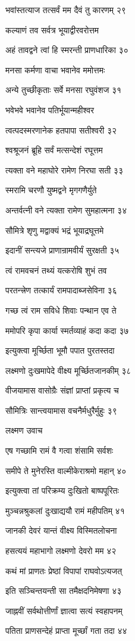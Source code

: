भवांस्तत्याज तत्सर्वं मम दैवं तु कारणम् २९

कल्याणं तव सर्वत्र भूयाद्वीरवरोत्तम

अहं तावद्वने त्वां हि स्मरन्ती प्राणधारिका ३०

मनसा कर्मणा वाचा भवानेव ममोत्तमः

अन्ये तुच्छीकृताः सर्वे मनसा रघुवंशज ३१

भवेभवे भवानेव पतिर्भूयान्महीश्वर

त्वत्पदस्मरणानेक हतपापा सतीश्वरी ३२

श्वश्रूजनं ब्रूहि सर्वं मत्सन्देशं रघूत्तम

त्यक्ता वने महाघोरे रामेण निरघा सती ३३

स्मरामि चरणौ युष्मद्वने मृगगणैर्युते

अन्तर्वत्नी वने त्यक्ता रामेण सुमहात्मना ३४

सौमित्रे शृणु मद्वाक्यं भद्रं भूयाद्रघूत्तमे

इदानीं सन्त्यजे प्राणान्रामवीर्यं सुरक्षती ३५

त्वं रामवचनं तथ्यं यत्करोषि शुभं तव

परतन्त्त्रेण तत्कार्यं रामपादाब्जसेविना ३६

गच्छ त्वं राम सविधे शिवाः पन्थान एव ते

ममोपरि कृपा कार्या स्मर्तव्याहं कदा कदा ३७

इत्युक्त्वा मूर्च्छिता भूमौ पपात पुरतस्तदा

लक्ष्मणो दुःखमापेदे वीक्ष्य मूर्च्छितजानकीम् ३८

वीजयामास वासोग्रैः संज्ञां प्राप्तां प्रकृत्य च

सौमित्रिः सान्त्वयामास वचनैर्मधुरैर्मुहुः ३९

लक्ष्मण उवाच

एष गच्छामि रामं वै गत्वा शंसामि सर्वशः

समीपे ते मुनेरस्ति वाल्मीकेराश्रमो महान् ४०

इत्युक्त्वा तां परिक्रम्य दुःखितो बाष्पपूरितः

मुञ्चन्नश्रुकलां दुःखाद्ययौ रामं महीपतिम् ४१

जानकी देवरं यान्तं वीक्ष्य विस्मितलोचना

हसत्ययं महाभागो लक्ष्मणो देवरो मम ४२

कथं मां प्राणतः प्रेष्ठां विपापां राघवोऽत्यजत्

इति सञ्चिन्तयन्ती सा तमैक्षदनिमेषणा ४३

जाह्नवीं सर्वथोत्तीर्णां ज्ञात्वा सत्यं स्वहापनम्

पतिता प्राणसन्देहं प्राप्ता मूर्च्छां गता तदा ४४

